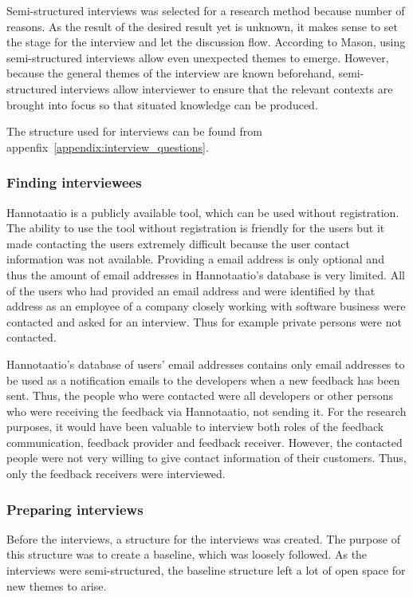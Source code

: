 \documentclass[english,12pt,a4paper,pdftex]{article}
\begin{document}
Semi-structured interviews was selected for a research method because number of reasons. As the result of the desired result yet is unknown, it makes sense to set the stage for the interview and let the discussion flow. According to Mason, using semi-structured interviews allow even unexpected themes to emerge. However, because the general themes of the interview are known beforehand, semi-structured interviews allow interviewer to ensure that the relevant contexts are brought into focus so that situated knowledge can be produced. \citep{mason2004}

The structure used for interviews can be found from appenfix~\ref{appendix:interview_questions}.

\subsubsection{Finding interviewees}

Hannotaatio is a publicly available tool, which can be used without registration. The ability to use the tool without registration is friendly for the users but it made contacting the users extremely difficult because the user contact information was not available. Providing a email address is only optional and thus the amount of email addresses in Hannotaatio's database is very limited. All of the users who had provided an email address and were identified by that address as an employee of a company closely working with software business were contacted and asked for an interview. Thus for example private persons were not contacted.

Hannotaatio's database of users' email addresses contains only email addresses to be used as a notification emails to the developers when a new feedback has been sent. Thus, the people who were contacted were all developers or other persons who were receiving the feedback via Hannotaatio, not sending it. For the research purposes, it would have been valuable to interview both roles of the feedback communication, feedback provider and feedback receiver. However, the contacted people were not very willing to give contact information of their customers. Thus, only the feedback receivers were interviewed.

\subsubsection{Preparing interviews}

Before the interviews, a structure for the interviews was created. The purpose of this structure was to create a baseline, which was loosely followed. As the interviews were semi-structured, the baseline structure left a lot of open space for new themes to arise.
\end{document}
